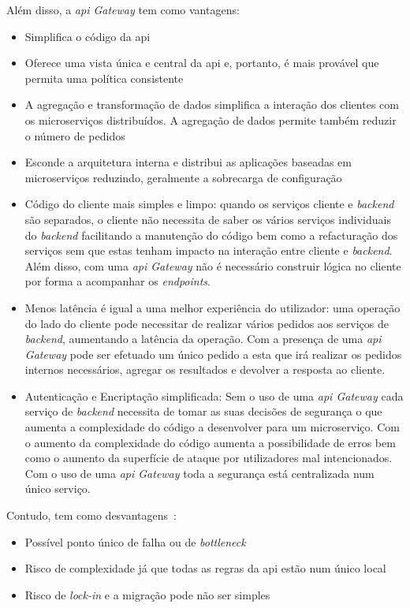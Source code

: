 Além disso, a \textit{\acrshort{api} Gateway} tem como vantagens:~\cite{apiGatInfo, apiGatInfo3}
\begin{itemize}
    \item Simplifica o código da \acrshort{api}
    \item Oferece uma vista única e central da \acrshort{api} e, portanto, é mais provável que permita uma política consistente
    \item A agregação e transformação de dados simplifica a interação dos clientes com os microserviços distribuídos. A agregação de dados permite também reduzir o número de pedidos
    \item Esconde a arquitetura interna e distribui as aplicações baseadas em microserviços reduzindo, geralmente a sobrecarga de configuração 
    \item Código do cliente mais simples e limpo: quando os serviços cliente e \textit{backend} são separados, o cliente não necessita de saber os vários serviços individuais do \textit{backend} facilitando a manutenção do código bem como a refacturação dos serviços sem que estas tenham impacto na interação entre cliente e \textit{backend}. Além disso, com uma \textit{\acrshort{api} Gateway} não é necessário construir lógica no cliente por forma a acompanhar os \textit{endpoints}.
    \item Menos latência é igual a uma melhor experiência do utilizador: uma operação do lado do cliente pode necessitar de realizar vários pedidos aos serviços de \textit{backend}, aumentando a latência da operação. Com a presença de uma \textit{\acrshort{api} Gateway} pode ser efetuado um único pedido a esta que irá realizar os pedidos internos necessários, agregar os resultados e devolver a resposta ao cliente.
    \item Autenticação e Encriptação simplificada: Sem o uso de uma \textit{\acrshort{api} Gateway} cada serviço de \textit{backend} necessita de tomar as suas decisões de segurança o que aumenta a complexidade do código a desenvolver para um microserviço. Com o aumento da complexidade do código aumenta a possibilidade de erros bem como o aumento da superfície de ataque por utilizadores mal intencionados. Com o uso de uma \textit{\acrshort{api} Gateway} toda a segurança está centralizada num único serviço.
\end{itemize}

Contudo, tem como desvantagens~\cite{apiGatInfo}:
\begin{itemize}
    \item Possível ponto único de falha ou de \textit{bottleneck}
    \item Risco de complexidade já que todas as regras da \acrshort{api} estão num único local
    \item Risco de \textit{lock-in} e a migração pode não ser simples
\end{itemize}

